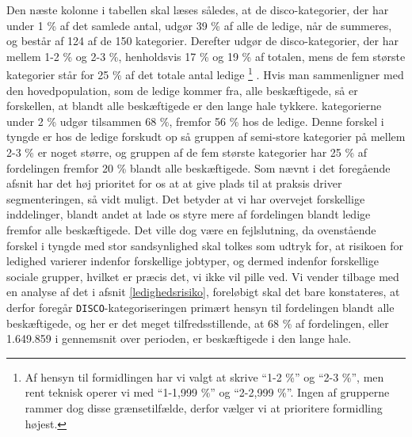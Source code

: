 Den næste kolonne i tabellen skal læses således, at de disco-kategorier, der har under 1 \% af det samlede antal, udgør 39 \% af alle de ledige, når de summeres, og består af 124 af de 150 kategorier. Derefter udgør de disco-kategorier, der har mellem 1-2 \% og 2-3 \%, henholdsvis 17 \% og 19 \% af totalen, mens de fem største kategorier står for 25 \% af det totale antal ledige%
%
\footnote{Af hensyn til formidlingen har vi valgt at skrive “1-2 \%” og “2-3 \%”, men rent teknisk operer vi med “1-1,999 \%” og “2-2,999 \%”. Ingen af grupperne rammer dog disse grænsetilfælde, derfor vælger vi at prioritere formidling højest.}%
%
. Hvis man sammenligner med den hovedpopulation, som de ledige kommer fra, alle beskæftigede, så er forskellen, at blandt alle beskæftigede er den lange hale tykkere. kategorierne under 2 \% udgør tilsammen 68 \%, fremfor 56 \% hos de ledige. Denne forskel i tyngde er hos de ledige forskudt op så gruppen af semi-store kategorier på mellem 2-3 \% er noget større, og gruppen af de fem største kategorier har 25 \% af fordelingen fremfor 20 \% blandt alle beskæftigede. Som nævnt i det foregående afsnit har det høj prioritet for os at at give plads til at praksis driver segmenteringen, så vidt muligt.  Det betyder at vi har overvejet forskellige inddelinger, blandt andet at lade os styre mere af fordelingen blandt ledige fremfor alle beskæftigede. Det ville dog være en fejlslutning, da ovenstående forskel i tyngde med stor sandsynlighed skal tolkes som udtryk for, at risikoen for ledighed varierer indenfor forskellige jobtyper, og dermed indenfor forskellige sociale grupper, hvilket er præcis det, vi ikke vil pille ved. Vi vender tilbage med en analyse af det i afsnit \ref{ledighedsrisiko}, foreløbigt skal det bare konstateres, at derfor foregår \texttt{DISCO}-kategoriseringen primært hensyn til fordelingen blandt alle beskæftigede, og her er det meget tilfredsstillende, at 68 \% af fordelingen, eller 1.649.859 i gennemsnit over perioden, er beskæftigede i den lange hale.
% 
